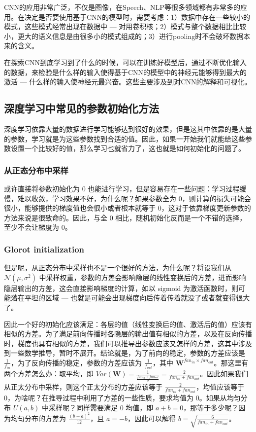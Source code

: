 CNN的应用非常广泛，不仅是图像，在Speech、NLP等很多领域都有非常多的应用。在决定是否要使用基于CNN的模型时，需要考虑：1）数据中存在一些较小的模式，这些模式经常出现在数据中 --- 对用卷积核；2）模式与整个数据相比比较小，更大的语义信息是由很多小的模式组成的；3）进行pooling时不会破坏数据本来的含义。

在探索CNN到底学习到了什么的时候，可以在训练好模型后，通过不断优化输入的数据，来检验是什么样的输入使得基于CNN的模型中的神经元能够得到最大的激活 --- 什么样的输入使神经元最兴奋。这些主要涉及到对CNN的解释和可视化。

\subsection{深度学习中常见的参数初始化方法}
深度学习依靠大量的数据进行学习能够达到很好的效果，但是这其中依靠的是大量的参数，学习就是为这些参数找到合适的值。因此，如果一开始我们就能给这些参数设置一个比较好的值，那么学习也就省力了，这也就是如何初始化的问题了。

\subsubsection{从正态分布中采样}
或许直接将参数初始化为 0 也能进行学习，但是容易存在一些问题：学习过程缓慢，难以收敛，学习效果不好，为什么呢？如果参数全为 0，则计算的损失可能会很小，能够提供的梯度值也会很小或者根本就等于 0，这对于依靠梯度更新参数的方法来说是很致命的。因此，与全 0 相比，随机初始化反而是一个不错的选择，至少不会让梯度为 0。

\subsubsection{Glorot initialization}
但是呢，从正态分布中采样也不是一个很好的方法，为什么呢？将设我们从 $\mathcal{N}(\mu, \sigma^2)$ 中采样权重，参数的方差会影响隐层的线性变换后的方差，进而影响隐层输出的方差，这会直接影响梯度的计算，如以 sigmoid 为激活函数时，则可能落在平坦的区域 --- 也就是可能会出现梯度向后传着传着就没了或者就变得很大了。

因此一个好的初始化应该满足：各层的值（线性变换后的值、激活后的值）应该有相似的方差。为了满足前向传播时各隐层的输出值有相似的方差，以及在反向传播时，梯度也具有相似的方差，我们可以推导出参数应该又怎样的方差，这其中涉及到一些数学推导，暂时不展开。结论就是，为了前向的稳定，参数的方差应该是 $\frac{1}{f_{in}}$，为了反向传播的稳定，参数的方差应该为 $\frac{1}{f_{out}}$，其中 $\boldsymbol{W}^{fan_{in} \times fan_{out}}$。那这里有两个方差怎么办：取平均，即 $Var(\boldsymbol{W}) = \frac{1}{ \frac{fan_{in} + fan_{out}}{2}}  = \frac{2}{fan_{in} + fan_{out}}$。因此如果我们从正太分布中采样，则这个正太分布的方差应该等于 $\frac{2}{fan_{in} + fan_{out}}$，均值应该等于 0，为啥呢？在推导过程中利用了方差的一些性质，要求均值为 0。如果从均匀分布 $U(a, b)$ 中采样呢？同样需要满足 0 均值，即 $a + b = 0$，那等于多少呢？因为均匀分布的方差为 $\frac{(b - a)^2}{12}$，且 $a = -b$，因此可以解得 $b = \sqrt{\frac{6}{fan_{in} + fan_{out}}}$。

